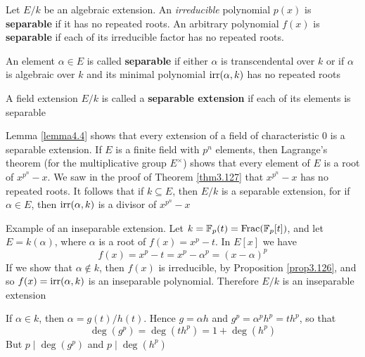 \documentclass[11pt]{article}
\DeclareMathOperator{\Frac}{Frac}
\begin{document}
\begin{definition}[]
Let \(E/k\) be an algebraic extension. An \emph{irreducible} polynomial \(p(x)\) is
\textbf{separable} if it has no repeated roots. An arbitrary polynomial \(f(x)\) is
\textbf{separable} if each of its irreducible factor has no repeated roots.

An element \(\alpha\in E\) is called \textbf{separable} if either \(\alpha\) is transcendental
over \(k\) or if \(\alpha\) is algebraic over \(k\) and its minimal polynomial
\(\operatorname{irr}(\alpha,k)\) has no repeated roots

A field extension \(E/k\) is called a \textbf{separable extension} if each of its
elements is separable
\end{definition}

Lemma \ref{lemma4.4} shows that every extension of a field of characteristic 0
is a separable extension. If \(E\) is a finite field with \(p^n\) elements, then
Lagrange's theorem (for the multiplicative group \(E^\times\)) shows that every
element of \(E\) is a root of \(x^{p^n}-x\). We saw in the proof of Theorem
\ref{thm3.127} that \(x^{p^n}-x\) has no repeated roots. It follows that 
if \(k\subseteq E\), then \(E/k\) is a separable extension, for if
\(\alpha\in E\), then \(\operatorname{irr}(\alpha,k)\) is a divisor of \(x^{p^n}-x\)

\begin{examplle}[]
Example of an inseparable extension. Let \(k=\F_p(t)=\Frac(\F_p[t])\), and
let \(E=k(\alpha)\), where \(\alpha\) is a root of \(f(x)=x^p-t\). In \(E[x]\) we have
\begin{equation*}
f(x)=x^p-t=x^p-\alpha^p=(x-\alpha)^p
\end{equation*}
If we show that \(\alpha\not\in k\), then \(f(x)\) is irreducible, by
Proposition \ref{prop3.126}, and so \(f(x)=\operatorname{irr}(\alpha,k)\) is an inseparable
polynomial. Therefore \(E/k\) is an inseparable extension

If \(\alpha\in k\), then \(\alpha=g(t)/h(t)\). Hence \(g=\alpha h\) and 
\(g^p=\alpha^p h^p=th^p\), so that
\begin{equation*}
\deg(g^p)=\deg(th^p)=1+\deg(h^p)
\end{equation*}
But \(p\mid\deg(g^p)\) and \(p\mid\deg(h^p)\)
\end{examplle}
\end{document}
